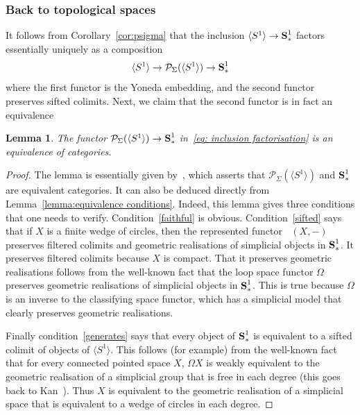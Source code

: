 \documentclass[psamsfonts]{amsart}
\theoremstyle{plain}
\newtheorem{lem}[thm]{Lemma}
\theoremstyle{definition}
\theoremstyle{remark}
\newcommand{\catname}[1]{{\normalfont\textbf{#1}}}
\newcommand{\circles}{\langle S^1 \rangle}
\newcommand{\spaces}{\catname{S}_*}
\newcommand{\connected}{\spaces^{1}}
\newcommand{\presh}{\mathcal{P}}
\DeclareMathOperator{\map}{Map}
\DeclareMathOperator{\pointedmaps}{\map_*}
\begin{document}
\subsubsection*{Back to topological spaces} It follows from Corollary~\ref{cor:psigma} that the inclusion $\circles\to \connected$ factors essentially uniquely as a composition
\begin{equation}\label{eq: inclusion factorisation}
\circles \to \presh_{\Sigma}(\circles) \to \connected
\end{equation}
where the first functor is the Yoneda embedding, and the second functor preserves sifted colimits. Next, we claim that the second functor is in fact an equivalence 
\begin{lem}\label{lemma: connected generated by circles}
The functor $\presh_{\Sigma}(\circles) \to \connected$ in~\eqref{eq: inclusion factorisation} is an equivalence of categories.
\end{lem}
\begin{proof}
The lemma is essentially given by~\cite[Corollary 5.2.6.21]{LurieHA}, which asserts that $\presh_{\Sigma}(\circles)$ and $\connected$ are equivalent categories. It can also be deduced directly from Lemma~\ref{lemma:equivalence conditions}. Indeed, this lemma gives three conditions that one needs to verify. Condition~\eqref{faithful} is obvious. Condition~\eqref{sifted} says that if $X$ is a finite wedge of circles, then the represented functor $\pointedmaps(X, -)$ preserves filtered colimits and geometric realisations of simplicial objects in $\connected$. It preserves filtered colimits because $X$ is compact. That it preserves geometric realisations follows from the well-known fact that the loop space functor $\Omega$ preserves geometric realisations of simplicial objects in $\connected$. This is true because $\Omega$ is an inverse to the classifying space functor, which has a simplicial model that clearly preserves geometric realisations.

Finally condition~\eqref{generates} says that every object of $\connected$ is equivalent to a sifted colimit of objects of $\circles$. This follows (for example) from the well-known fact that for every connected pointed space $X$, $\Omega X$ is weakly equivalent to the geometric realisation of a simplicial group that is free in each degree (this goes back to Kan~\cite{KanLoop}). Thus $X$ is equivalent to the geometric realisation of a simplicial space that is equivalent to a wedge of circles in each degree.
\end{proof}
\end{document}
